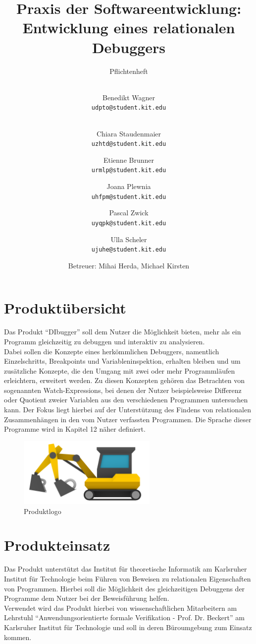 \documentclass[parskip=full]{scrartcl}
\title{
	\vspace{2cm}
	\myfont 
	Praxis der Softwareentwicklung:\\ 
	Entwicklung eines relationalen Debuggers\\
}
\subtitle{
	\vspace{1cm}
	\myfont
	Pflichtenheft
}
\author{
	\vspace{1cm} \\
	Benedikt Wagner\\
	\texttt{udpto@student.kit.edu}
	\and \vspace{1cm} \\ Chiara Staudenmaier\\
	\texttt{uzhtd@student.kit.edu}
	\and Etienne Brunner\\
	\texttt{urmlp@student.kit.edu}
	\and Joana Plewnia\\
	\texttt{uhfpm@student.kit.edu} 
	\and Pascal Zwick\\
	\texttt{uyqpk@student.kit.edu}
	\and Ulla Scheler\\
	\texttt{ujuhe@student.kit.edu}
	\vspace{1cm}
	\and Betreuer: Mihai Herda, Michael Kirsten
	\vspace{4cm}
}
\begin{document}
\clearpage
\maketitle
{}
\newpage

\tableofcontents
\newpage
{}
\section{Produktübersicht}
Das Produkt \enquote{DIbugger} soll dem Nutzer die Möglichkeit bieten, mehr als ein Programm gleichzeitig zu debuggen und interaktiv zu analysieren. \\
Dabei sollen die Konzepte eines herkömmlichen Debuggers, namentlich \glspl{Einzelschritt}, \glspl{Breakpoint} und Variableninspektion, erhalten bleiben und um zusätzliche Konzepte, die den Umgang mit zwei oder mehr Programmläufen erleichtern, erweitert werden. Zu diesen Konzepten gehören das Betrachten von sogenannten \glspl{Watch-Expression}, bei denen der Nutzer beispielsweise Differenz oder Quotient zweier Variablen aus den verschiedenen Programmen untersuchen kann. Der Fokus liegt hierbei auf der Unterstützung des Findens von relationalen Zusammenhängen in den vom Nutzer verfassten Programmen.
Die Sprache dieser Programme wird in Kapitel 12 näher definiert.
\vspace{0.7cm}
\begin{figure}[!h]
\centering
\includegraphics[width=0.6\textwidth]{logo_nongi.png}
\caption{Produktlogo}
\end{figure}

\section{Produkteinsatz}
Das Produkt unterstützt das Institut für theoretische Informatik am Karlsruher Institut für Technologie beim Führen von Beweisen zu relationalen Eigenschaften von Programmen. Hierbei soll die Möglichkeit des gleichzeitigen Debuggens der Programme dem Nutzer bei der Beweisführung helfen. \\
Verwendet wird das Produkt hierbei von wissenschaftlichen Mitarbeitern am Lehrstuhl \enquote{Anwendungsorientierte formale Verifikation - Prof. Dr. Beckert} am Karlsruher Institut für Technologie und soll in deren Büroumgebung zum Einsatz kommen. 
\end{document}
